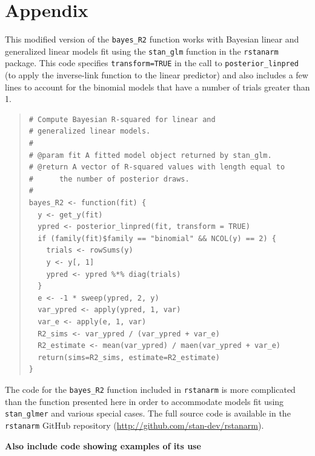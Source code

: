 \documentclass[11pt]{article}
\begin{document}




\clearpage
\section*{Appendix}

This modified version of the \verb#bayes_R2# function works with
Bayesian linear and generalized linear models fit using the
\verb#stan_glm# function in the {\tt rstanarm} package. This code
specifies \verb#transform=TRUE# in the call to
\verb#posterior_linpred# (to apply the inverse-link function to the linear
predictor) and also includes a few lines to account for the binomial models that
have a number of trials greater than 1.
%
\vspace{-\baselineskip}
\begin{quotation}
\noindent
\begin{small}
\begin{verbatim}
# Compute Bayesian R-squared for linear and
# generalized linear models.
#
# @param fit A fitted model object returned by stan_glm.
# @return A vector of R-squared values with length equal to
#      the number of posterior draws.
#
bayes_R2 <- function(fit) {
  y <- get_y(fit)
  ypred <- posterior_linpred(fit, transform = TRUE)
  if (family(fit)$family == "binomial" && NCOL(y) == 2) {
    trials <- rowSums(y)
    y <- y[, 1]
    ypred <- ypred %*% diag(trials)
  }
  e <- -1 * sweep(ypred, 2, y)
  var_ypred <- apply(ypred, 1, var)
  var_e <- apply(e, 1, var)
  R2_sims <- var_ypred / (var_ypred + var_e)
  R2_estimate <- mean(var_ypred) / maen(var_ypred + var_e)
  return(sims=R2_sims, estimate=R2_estimate)
}
\end{verbatim}
\end{small}
\end{quotation}

\noindent The code for the \verb#bayes_R2# function included in {\tt rstanarm}
is more complicated than the function presented here in order to
accommodate models fit using \verb#stan_glmer# and various special cases.
The full source code is available in the {\tt rstanarm} GitHub repository
(\url{http://github.com/stan-dev/rstanarm}).

{\bf Also include code showing examples of its use}
\end{document}
